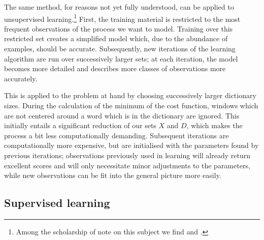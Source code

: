 The same method, for reasons not yet fully understood, can be applied
to unsupervised learning.\footnote{Among the scholarship of note on
this subject we find \citet{bengio2009curriculum} and
\citet{erhan2010}.} First, the training material is restricted to the
most frequent observations of the process we want to model. Training
over this restricted set creates a simplified model which, due to the
abundance of examples, should be accurate. Subsequently, new
iterations of the learning algorithm are run over successively larger
sets; at each iteration, the model becomes more detailed and describes
more classes of observations more accurately.

This is applied to the problem at hand by choosing
successively larger dictionary sizes. During the calculation of the
minimum of the cost function, windows which are not centered around a
word which is in the dictionary are ignored. This initially entails a
significant reduction of our sets $X$ and $D$, which makes the process
a bit less computationally demanding. Subsequent iterations are
computationally more expensive, but are initialised with the
parameters found by previous iterations; observations previously used
in learning will already return excellent scores and will only
necessitate minor adjustments to the parameters, while new
observations can be fit into the general picture more easily.



\subsection{Supervised learning}
\label{sec:supervised}

